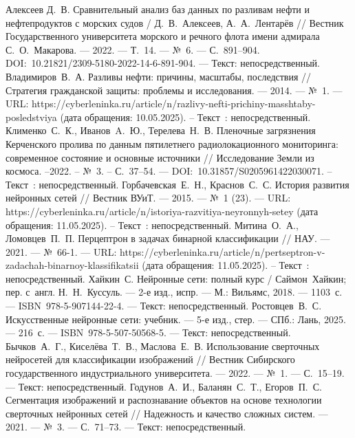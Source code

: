 
\begin{thebibliography}{99}

	  Алексеев Д.~В. Сравнительный анализ баз данных по разливам нефти и нефтепродуктов с морских судов / Д.~В.~Алексеев, А.~А.~Лентарёв // Вестник Государственного университета морского и речного флота имени адмирала С.~О.~Макарова. — 2022. — Т.~14. — №~6. — С.~891–904. DOI:~10.21821/2309-5180-2022-14-6-891-904. — Текст: непосредственный.
     Владимиров~В.~А. Разливы нефти: причины, масштабы, последствия // Стратегия гражданской защиты: проблемы и исследования. — 2014. — №~1. — URL: https://cyberleninka.ru/article/n/razlivy-nefti-prichiny-masshtaby-posledstviya (дата обращения: 10.05.2025). – Текст~: непосредственный.
     Клименко~С.~К., Иванов~A.~Ю., Терелева~Н.~В. Пленочные загрязнения Керченского пролива по данным пятилетнего радиолокационного мониторинга: современное состояние и основные источники // Исследование Земли из космоса. –2022. – №~3. – С.~37–54. — DOI:~10.31857/S0205961422030071. – Текст~: непосредственный.
    	Горбачевская~Е.~Н., Краснов~С.~С. История развития нейронных сетей  // Вестник ВУиТ.  — 2015. — №~1 (23). — URL: https://cyberleninka.ru/article/n/istoriya-razvitiya-neyronnyh-setey (дата обращения: 11.05.2025).  – Текст~: непосредственный.
	Митина~О.~А., Ломовцев~П.~П. Перцептрон в задачах бинарной классификации // НАУ. — 2021. — №~66-1. — URL: https://cyberleninka.ru/article/n/pertseptron-v-zadachah-binarnoy-klassifikatsii (дата обращения: 11.05.2025). – Текст~: непосредственный.
	 Хайкин~С. Нейронные сети: полный курс / Саймон~Хайкин; пер. с~англ. Н.~Н.~Куссуль. --- 2-е изд., испр. --- М.: Вильямс, 2018. --- 1103~с. --- ISBN~978-5-907144-22-4. --- Текст: непосредственный.
	 Ростовцев~В.~С. Искусственные нейронные сети: учебник. --- 5-е изд., стер. --- СПб.: Лань, 2025. --- 216~с. --- ISBN~978-5-507-50568-5. --- Текст: непосредственный.
	 Бычков~А.~Г., Киселёва~Т.~В., Маслова~Е.~В. Использование сверточных нейросетей для классификации изображений // Вестник Сибирского государственного индустриального университета. --- 2022. --- №~1. --- С.~15--19. --- Текст: непосредственный.
	 Годунов~А.~И., Баланян~С.~Т., Егоров~П.~С. Сегментация изображений и распознавание объектов на основе технологии сверточных нейронных сетей // Надежность и качество сложных систем. --- 2021. --- №~3. --- С.~71--73. --- Текст: непосредственный.

\end{thebibliography}
